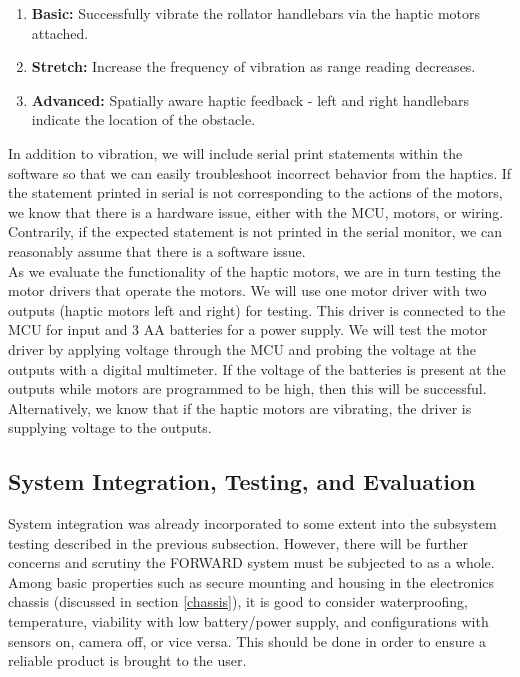 \begin{enumerate}
	\item \textbf{Basic:} Successfully vibrate the rollator handlebars via the haptic motors attached.
	\item \textbf{Stretch:} Increase the frequency of vibration as range reading decreases.
	\item \textbf{Advanced:} Spatially aware haptic feedback - left and right handlebars indicate the location of the obstacle.
\end{enumerate}

 
 \noindent In addition to vibration, we will include serial print statements within the software so that we can easily troubleshoot incorrect behavior from the haptics. If the statement printed in serial is not corresponding to the actions of the motors, we know that there is a hardware issue, either with the MCU, motors, or wiring. Contrarily, if the expected statement is not printed in the serial monitor, we can reasonably assume that there is a software issue.\\
 
 \noindent As we evaluate the functionality of the haptic motors, we are in turn testing the motor drivers that operate the motors. We will use one motor driver with two outputs (haptic motors left and right) for testing. This driver is connected to the MCU for input and 3 AA batteries for a power supply. We will test the motor driver by applying voltage through the MCU and probing the voltage at the outputs with a digital multimeter. If the voltage of the batteries is present at the outputs while motors are programmed to be high, then this will be successful. Alternatively, we know that if the haptic motors are vibrating, the driver is supplying voltage to the outputs.\\

\subsection{System Integration, Testing, and Evaluation}
\noindent System integration was already incorporated to some extent into the subsystem testing described in the previous subsection. However, there will be further concerns and scrutiny the FORWARD system must be subjected to as a whole. Among basic properties such as secure mounting and housing in the electronics chassis (discussed in section \ref{chassis}), it is good to consider waterproofing, temperature, viability with low battery/power supply, and configurations with sensors on, camera off, or vice versa. This should be done in order to ensure a reliable product is brought to the user.\\

